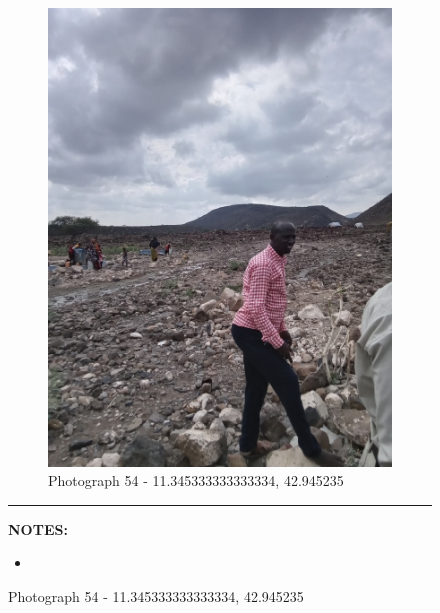 \documentclass[12pt, letterpaper]{article}
\begin{document}
\begin{figure}[h]
{{                \begin{subfigure}{\linewidth}
                    \centering
                    \includegraphics[width=0.37\textheight, angle=-90]{photos/13.png}
                    \captionsetup{width=0.8\linewidth}
                    \caption{Photograph 54 - 11.345333333333334, 42.945235}
                \end{subfigure}
                    \vspace{1mm}
                    \hrule
                \begin{minipage}[c][4.5cm][t]{1\textwidth} 
                    \begin{minipage}[t][2cm][t]{0.5\textwidth} 
	 				\vspace{2mm}
					\centering
					\textbf{\small{NOTES:}} \\ 
					\raggedright 
					\begin{itemize}
            					\item \footnotesize{}

\end{itemize}
\end{minipage}
\end{minipage}}}
\end{figure}
\end{document}
